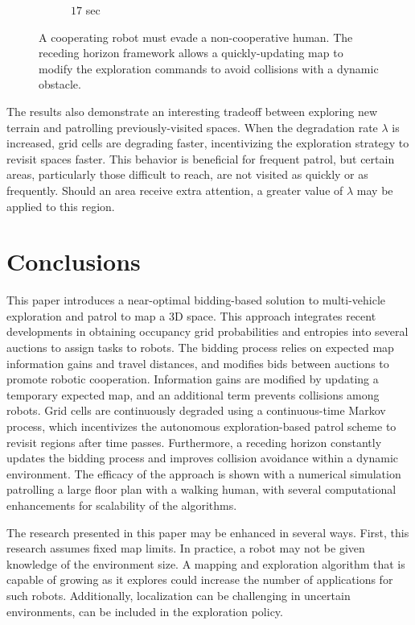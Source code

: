 \documentclass[smallextended]{svjour3}       %
\begin{document}
\begin{figure}[!t]
\begin{subfigure}[t]{0.3\columnwidth}
        		\caption{$17$ sec}
    	\end{subfigure}
	\caption{A cooperating robot must evade a non-cooperative human. The receding horizon framework allows a quickly-updating map to modify the exploration commands to avoid collisions with a dynamic obstacle.}
	\label{fig:EvadeHuman}
\end{figure}

The results also demonstrate an interesting tradeoff between exploring new terrain and patrolling previously-visited spaces. When the degradation rate $\lambda$ is increased, grid cells are degrading faster, incentivizing the exploration strategy to revisit spaces faster. This behavior is beneficial for frequent patrol, but certain areas, particularly those difficult to reach, are not visited as quickly or as frequently. Should an area receive extra attention, a greater value of $\lambda$ may be applied to this region.


\section{Conclusions}
\label{sec:Conclusions}

This paper introduces a near-optimal bidding-based solution to multi-vehicle exploration and patrol to map a 3D space. This approach integrates recent developments in obtaining occupancy grid probabilities and entropies into several auctions to assign tasks to robots. The bidding process relies on expected map information gains and travel distances, and modifies bids between auctions to promote robotic cooperation. Information gains are modified by updating a temporary expected map, and an additional term prevents collisions among robots. Grid cells are continuously degraded using a continuous-time Markov process, which incentivizes the autonomous exploration-based patrol scheme to revisit regions after time passes. Furthermore, a receding horizon constantly updates the bidding process and improves collision avoidance within a dynamic environment. The efficacy of the approach is shown with a numerical simulation patrolling a large floor plan with a walking human, with several computational enhancements for scalability of the algorithms.

The research presented in this paper may be enhanced in several ways. First, this research assumes fixed map limits. In practice, a robot may not be given knowledge of the environment size. A mapping and exploration algorithm that is capable of growing as it explores could increase the number of applications for such robots. Additionally, localization can be challenging in uncertain environments, can be included in the exploration policy.
\end{document}
